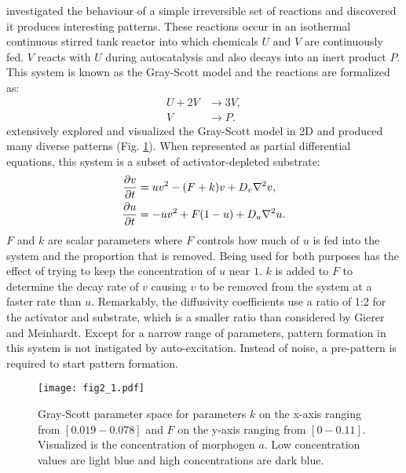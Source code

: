 \citet{gray1984} investigated the behaviour of a simple irreversible set of reactions and discovered it produces interesting patterns. These reactions occur in an isothermal continuous stirred tank reactor into which chemicals $U$ and $V$ are continuously fed. $V$ reacts with $U$ during autocatalysis and also decays into an inert product $P$. This system is known as the Gray-Scott model and the reactions are formalized as:
	\begin{equation}
	\begin{aligned}
		U + 2V &\to 3V, \\
		V &\to P.
	\end{aligned}
	\end{equation}
\citet{pearson1993} extensively explored and visualized the Gray-Scott model in 2D and produced many diverse patterns (Fig. \ref{fig:grayscottParameterMap}). When represented as partial differential equations, this system is a subset of activator-depleted substrate:
	\begin{equation}
	\begin{aligned} \label{eq:grayscottRD}
		\frac{\partial v}{\partial t} &= uv^2 - (F+k)v + D_v \nabla^2 v,\\
		\frac{\partial u}{\partial t} &= -uv^2 + F(1-u) + D_u \nabla^2 u.
	\end{aligned}
	\end{equation}
$F$ and $k$ are scalar parameters where $F$ controls how much of $u$ is fed into the system and the proportion that is removed. Being used for both purposes has the effect of trying to keep the concentration of $u$ near $1$. $k$ is added to $F$ to determine the decay rate of $v$ causing $v$ to be removed from the system at a faster rate than $u$. Remarkably, the diffusivity coefficients use a ratio of 1:2 for the activator and substrate, which is a smaller ratio than considered by Gierer and Meinhardt. Except for a narrow range of parameters, pattern formation in this system is not instigated by auto-excitation. Instead of noise, a pre-pattern is required to start pattern formation. 

\begin{figure}[H]
	\centering
	\texttt{[image: fig2\_1.pdf]}
	\caption{Gray-Scott parameter space for parameters $k$ on the x-axis ranging from $[0.019 - 0.078]$ and $F$ on the y-axis ranging from $[0 - 0.11]$. Visualized is the concentration of morphogen $a$. Low concentration values are light blue and high concentrations are dark blue.}
	\label{fig:grayscottParameterMap}
\end{figure}

